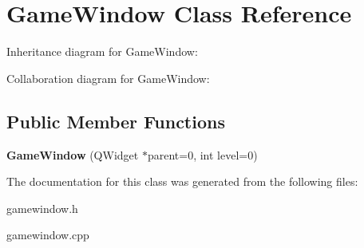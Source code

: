 \hypertarget{class_game_window}{\section{Game\+Window Class Reference}
\label{class_game_window}
}


Inheritance diagram for Game\+Window\+:


Collaboration diagram for Game\+Window\+:
\subsection*{Public Member Functions}
\begin{DoxyCompactItemize}
\item 
\hypertarget{class_game_window_a66368faf09314c3d4c30c9853de8fb20}{{\bfseries Game\+Window} (Q\+Widget $\ast$parent=0, int level=0)}\label{class_game_window_a66368faf09314c3d4c30c9853de8fb20}

\end{DoxyCompactItemize}


The documentation for this class was generated from the following files\+:\begin{DoxyCompactItemize}
\item 
gamewindow.\+h\item 
gamewindow.\+cpp\end{DoxyCompactItemize}

